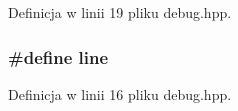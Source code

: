 Definicja w linii 19 pliku debug.hpp.\hypertarget{a00008_5bdec07ba0f5f220bcb40d5258725d95}{
\subsubsection[{line}]{\setlength{\rightskip}{0pt plus 5cm}\#define line}}
\label{d4/dee/a00008_5bdec07ba0f5f220bcb40d5258725d95}




Definicja w linii 16 pliku debug.hpp.